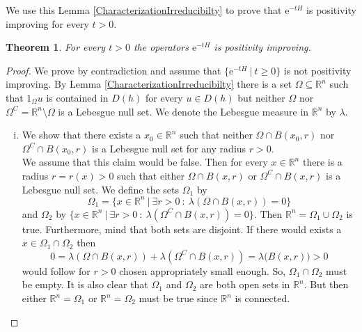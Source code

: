 \documentclass[12pt,longbibliography]{article}
\def\R{\mathbb{R}}
\newtheorem{thm}{Theorem}[section]
\theoremstyle{definition}
\theoremstyle{remark}
\theoremstyle{example}
\begin{document}
We use this Lemma \ref{CharacterizationIrreducibilty} to prove that $\mathrm{e}^{-tH}$ is positivity improving for every $t > 0$.\\

\begin{thm}
For every $t>0$ the operators $\mathrm{e}^{-tH}$ is positivity improving.\\
\end{thm}

\begin{proof}
We prove by contradiction and assume that $\{ \mathrm{e}^{-tH} \ | \  t \geq 0 \}$ is not positivity improving. 
By Lemma \ref{CharacterizationIrreducibilty} there is a set $\Omega \subseteq \R^{n}$ such that  
$1_{\Omega} u$  is contained in $D(h)$ for every $u \in D(h)$ but neither $\Omega$ nor 
$\Omega^{C}  = \R^{n} \setminus \Omega$ is a Lebesgue null set. We denote the Lebesgue measure in 
$\R^{n}$ by $\lambda$.\\

\begin{enumerate}[i.)]
\item We show that there exists a $x_{0} \in \R^{n}$ such that neither $\Omega \cap B(x_{0},r)$ nor 
$\Omega^{C} \cap B(x_{0},r)$ is a Lebesgue null set for any radius $r>0$.\\

We assume that this claim would be false. Then for every $x \in \R^{n}$ there is a radius $r=r(x) > 0$ such that either
$\Omega \cap B(x,r)$ or $\Omega^{C} \cap B(x,r)$ is a Lebesgue null set. We define the sets $\Omega_{1}$ by
$$
\Omega_{1} = \{ x \in \R^{n} \ | \ \exists r > 0 \ : \ \lambda(\Omega \cap B(x,r)) = 0 \}
$$
and $\Omega_{2}$ by $\{ x \in \R^{n} \ | \ \exists r > 0 \ : \ \lambda(\Omega^{C} \cap B(x,r)) = 0 \}$. Then 
$\R^{n} = \Omega_{1} \cup \Omega_{2}$ is true. Furthermore, mind that both sets 
are disjoint. If there would exists a $x \in \Omega_{1} \cap \Omega_{2}$ then
$$
0  = \lambda(\Omega \cap B(x,r)) + \lambda(\Omega^{C} \cap B(x,r)) = \lambda \bigl( B(x,r) \bigr) > 0
$$
would follow for $r>0$ chosen appropriately small enough. So, $\Omega_{1} \cap \Omega_{2}$ must be empty. 
It is also clear that $\Omega_{1}$ and $\Omega_{2}$ are 
both open sets in $\R^{n}$. But then either $\R^{n} = \Omega_{1}$ or $\R^{n} = \Omega_{2}$ must be true since $\R^{n}$
is connected.\\


\end{enumerate}
\end{proof}
\end{document}
